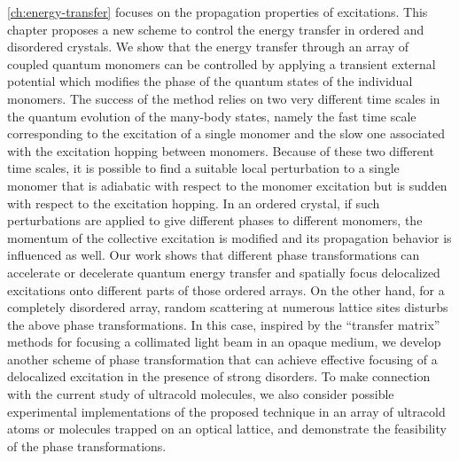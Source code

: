\autoref{ch:energy-transfer} focuses on the propagation properties of excitations. This chapter proposes a new scheme to control the 
energy transfer in ordered and disordered crystals. 
We 
show that the energy transfer through an array of coupled quantum monomers can be controlled by applying a 
transient external potential which modifies the phase of the quantum states of the individual monomers. The success of the 
method relies 
on two very different time scales in the quantum evolution of the many-body states, namely the fast time scale 
corresponding to the excitation of a single monomer and the slow one associated with the excitation hopping between 
monomers.  Because of these two different time scales,  it is possible to find a suitable
local perturbation to a single monomer that is adiabatic with respect to the monomer excitation but is sudden
with respect to the excitation hopping. 
 In an ordered crystal, if such perturbations are applied to give different phases to 
different monomers, the momentum of the collective excitation is modified and its propagation behavior is influenced
as well. Our work shows that different phase transformations can accelerate or decelerate quantum energy transfer and 
spatially focus delocalized excitations onto different parts of those ordered arrays. On the other hand, for a completely disordered array,  random scattering at numerous lattice sites disturbs the above phase transformations. In this case,  inspired by the ``transfer matrix'' methods for focusing  a 
collimated light beam in an opaque medium\cite{opaque-1, Gigan-TMeasure-PRL10, Mosk-NPhot10, Cizmar-NPhot10, 
Silberberg-11, Chatel-Focusing-11, Lagendijk-Focusing-11, zhenia-11, cui-11, kim-11},
we develop another scheme of phase transformation that 
can achieve effective focusing of a delocalized excitation in the presence of strong disorders. To make connection with the current study of  
ultracold molecules,  we also consider possible experimental implementations of the proposed technique in an array of 
ultracold atoms or molecules trapped on an optical lattice, and demonstrate the feasibility of the phase transformations. 

